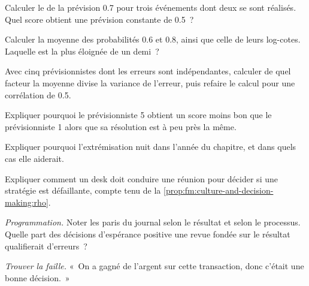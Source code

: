 \begin{exercise}[$\star$]\label{exo:fm:culture-and-decision-making:1}
Calculer le  de la prévision 0.7 pour trois événements dont deux se sont réalisés. Quel score obtient une prévision constante de 0.5~?
\end{exercise}

\begin{exercise}[$\star$]\label{exo:fm:culture-and-decision-making:2}
Calculer la moyenne des probabilités 0.6 et 0.8, ainsi que celle de leurs log-cotes. Laquelle est la plus éloignée de un demi~?
\end{exercise}

\begin{exercise}[$\star$]\label{exo:fm:culture-and-decision-making:3}
Avec cinq prévisionnistes dont les erreurs sont indépendantes, calculer de quel facteur la moyenne divise la variance de l'erreur, puis refaire le calcul pour une corrélation de 0.5.
\end{exercise}

\begin{exercise}[$\star\star$]\label{exo:fm:culture-and-decision-making:4}
Expliquer pourquoi le prévisionniste 5 obtient un score moins bon que le prévisionniste 1 alors que sa résolution est à peu près la même.
\end{exercise}

\begin{exercise}[$\star\star$]\label{exo:fm:culture-and-decision-making:5}
Expliquer pourquoi l'extrémisation nuit dans l'année du chapitre, et dans quels cas elle aiderait.
\end{exercise}

\begin{exercise}[$\star\star$]\label{exo:fm:culture-and-decision-making:6}
Expliquer comment un desk doit conduire une réunion pour décider si une stratégie est défaillante, compte tenu de la \cref{prop:fm:culture-and-decision-making:rho}.
\end{exercise}

\begin{exercise}[$\star\star\star$]\label{exo:fm:culture-and-decision-making:7}
\emph{Programmation.} Noter les paris du journal selon le résultat et selon le processus. Quelle part des décisions d'espérance positive une revue fondée sur le résultat qualifierait
d'erreurs~?
\end{exercise}

\begin{exercise}[$\star\star\star$]\label{exo:fm:culture-and-decision-making:8}
\emph{Trouver la faille.} «~On a gagné de l'argent sur cette transaction, donc c'était une bonne décision.~»
\end{exercise}

